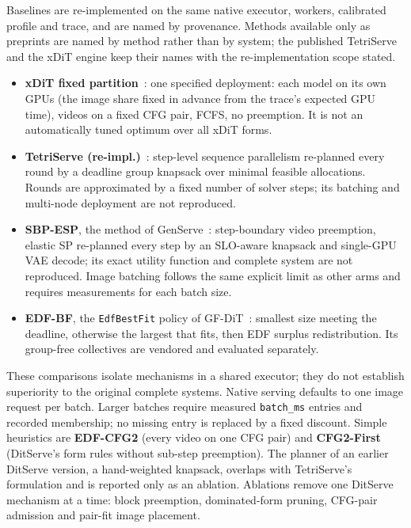 \documentclass[11pt,a4paper]{article}
\begin{document}
Baselines are re-implemented on the same native executor, workers, calibrated
profile and trace, and are named by provenance. Methods available only as
preprints are named by method rather than by system; the published TetriServe
and the xDiT engine keep their names with the re-implementation scope stated.
\begin{itemize}
  \item \textbf{xDiT fixed partition}~\cite{fang2024xdit}: one specified deployment:
        each model on its own GPUs (the image share fixed in advance from the
        trace's expected GPU time), videos on a fixed CFG pair, FCFS, no
        preemption. It is not an automatically tuned optimum over all xDiT forms.
  \item \textbf{TetriServe (re-impl.)}~\cite{lu2026tetriserve}: step-level
        sequence parallelism re-planned every round by a deadline group knapsack
        over minimal feasible allocations. Rounds are approximated by a fixed
        number of solver steps; its batching and multi-node deployment are not
        reproduced.
  \item \textbf{SBP-ESP}, the method of GenServe~\cite{ye2026genserve}:
        step-boundary video preemption, elastic SP re-planned every step by an
        SLO-aware knapsack and single-GPU VAE decode; its exact utility function
        and complete system are not reproduced. Image batching follows the same
        explicit limit as other arms and requires measurements for each batch size.
  \item \textbf{EDF-BF}, the \texttt{EdfBestFit} policy of
        GF-DiT~\cite{gfdit2026}: smallest size meeting the deadline, otherwise
        the largest that fits, then EDF surplus redistribution. Its
        group-free collectives are vendored and evaluated separately.
\end{itemize}
These comparisons isolate mechanisms in a shared executor; they do not establish
superiority to the original complete systems. Native serving defaults to one
image request per batch. Larger batches require measured \texttt{batch\_ms}
entries and recorded membership; no missing entry is replaced by a fixed discount.
Simple heuristics are \textbf{EDF-CFG2} (every video on one CFG pair) and
\textbf{CFG2-First} (DitServe's form rules without sub-step preemption). The
planner of an earlier DitServe version, a hand-weighted knapsack, overlaps with
TetriServe's formulation and is reported only as an ablation. Ablations remove
one DitServe mechanism at a time: block preemption, dominated-form pruning,
CFG-pair admission and pair-fit image placement.
\end{document}

